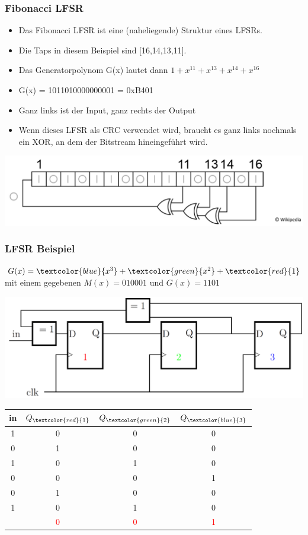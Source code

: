 \subsubsection{Fibonacci LFSR}
\begin{itemize}
	\item Das Fibonacci LFSR ist eine (naheliegende) Struktur eines LFSRs.
	\item Die Taps in diesem Beispiel sind [16,14,13,11].
	\item Das Generatorpolynom G(x) lautet dann $1 + x^{11} + x^{13} + x^{14} + x^{16}$
	\item G(x) = 1011010000000001 = 0xB401
	\item Ganz links ist der Input, ganz rechts der Output
	\item Wenn dieses LFSR als CRC verwendet wird, braucht es ganz links nochmals ein XOR, an dem der Bitstream hineingeführt wird.
\end{itemize}
\includegraphics[width=0.6\linewidth]{images/CRC/lfsr.png}
\subsubsection{LFSR Beispiel}
$G(x)=\textcolor{blue}{x^3}+ \textcolor{green}{x^2} + \textcolor{red}{1}$ mit einem gegebenen $M(x)= 010001$ und $G(x)= 1101$


\begin{minipage}{\linewidth}
	\begin{minipage}[b]{0.7\linewidth}
		\centering
		\includegraphics[width=0.7\linewidth]{images/CRC/ff-LFSR.png}
    \vfill\null
	\end{minipage}
	\begin{minipage}[b]{0.29\linewidth}
		\centering
\renewcommand{\arraystretch}{1}

\begin{tabular}{cccc}
	in	& $Q_{\textcolor{red}{1}}$	& $Q_{\textcolor{green}{2}}$	& $Q_{\textcolor{blue}{3}}$	\\
	\hline
	1 	& 	0 	& 	0 	& 	0 	\\
	0 	& 	1 	& 	0 	& 	0 	\\
	1 	& 	0 	& 	1 	& 	0 	\\
	0 	& 	0 	& 	0 	& 	1 	\\
	0 	& 	1 	& 	0 	& 	0 	\\
	1 	& 	0 	& 	1 	& 	0 	\\
	\hline
	& 	\textcolor{red}{0} 	& 	\textcolor{red}{0} 	& 	\textcolor{red}{1}  	\\
\end{tabular}
\vfill\null
	\end{minipage}
\end{minipage}


